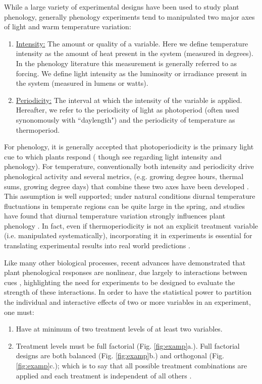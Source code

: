 \documentclass[11pt]{article}
\begin{document}
While a large variety of experimental designs have been used to study plant phenology, generally phenology experiments tend to manipulated two major axes of light and warm temperature variation:
\begin{enumerate}
\item \underline{Intensity:} The amount or quality of a variable. Here we define temperature intensity as the amount of heat present in the system (measured in degrees). In the phenology literature this measurement is generally referred to as forcing. We define light intensity as the luminosity or irradiance present in the system (measured in lumens or watts). 
\item \underline{Periodicity:} The interval at which the intensity of the variable is applied. Hereafter, we refer to the periodicity of light as photoperiod (often used synonomously with ``daylength") and the periodicity of temperature as thermoperiod. 
\end{enumerate}
For phenology, it is generally accepted that photoperiodicity is the primary light cue to which plants respond (\citep{WAY:2015aa} though see \citep{Brelsford2018,Cober1996} regarding light intensity and phenology). For temperature, conventionally both intensity and periodicity drive phenological activity and several metrics, (e.g. growing degree hours, thermal sums, growing degree days)  that combine these two axes have been developed \citep{Gu:2016wa}. This assumption is well supported; under natural conditions diurnal temperature fluctuations in temperate regions can be quite large in the spring, and studies have found that diurnal temperature variation strongly influences plant phenology \citep{Burghardt:2016uy}. In fact, even if thermoperiodicity is not an explicit treatment variable (i.e. manipulated systematically), incorporating it in experiments is essential for translating experimental results into real world predictions \citep{plants9101312}.

Like many other biological processes, recent advances have demonstrated that plant phenological responses are nonlinear, due largely to interactions between cues \citep{limitingcues,fu2015}, highlighting the need for experiments to be designed to evaluate the strength of these interactions. In order to have the statistical power to partition the individual and interactive effects of two or more variables in an experiment, one must:
\begin{enumerate}
\item Have at minimum of two treatment levels of at least two variables.
\item Treatment levels must be full factorial (Fig. \ref{fig:examp}a.). Full factorial designs are both balanced (Fig. \ref{fig:examp}b.)  and orthogonal (Fig. \ref{fig:examp}c.); which is to say that all possible treatment combinations are applied and each treatment is independent of all others \citep{cheng2016}.
\end{enumerate}
\end{document}
